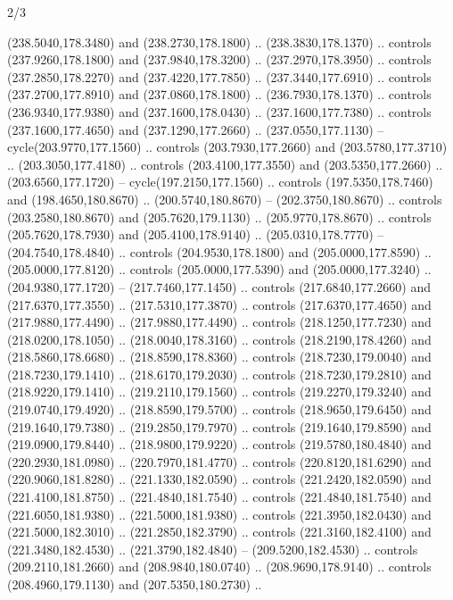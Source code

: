 \begin{flagdescription}{2/3}
\begin{scope}[xshift=0.5\flaglength,yshift=0.5\flagwidth,scale=\flagwidth/259.2]
\begin{scope}[y=0.8pt, x=0.8pt, yscale=-1,shift={(-243,-162)}]
      (238.5040,178.3480) and (238.2730,178.1800) .. (238.3830,178.1370) .. controls
      (237.9260,178.1800) and (237.9840,178.3200) .. (237.2970,178.3950) .. controls
      (237.2850,178.2270) and (237.4220,177.7850) .. (237.3440,177.6910) .. controls
      (237.2700,177.8910) and (237.0860,178.1800) .. (236.7930,178.1370) .. controls
      (236.9340,177.9380) and (237.1600,178.0430) .. (237.1600,177.7380) .. controls
      (237.1600,177.4650) and (237.1290,177.2660) .. (237.0550,177.1130) --
      cycle(203.9770,177.1560) .. controls (203.7930,177.2660) and
      (203.5780,177.3710) .. (203.3050,177.4180) .. controls (203.4100,177.3550) and
      (203.5350,177.2660) .. (203.6560,177.1720) -- cycle(197.2150,177.1560) ..
      controls (197.5350,178.7460) and (198.4650,180.8670) .. (200.5740,180.8670) --
      (202.3750,180.8670) .. controls (203.2580,180.8670) and (205.7620,179.1130) ..
      (205.9770,178.8670) .. controls (205.7620,178.7930) and (205.4100,178.9140) ..
      (205.0310,178.7770) -- (204.7540,178.4840) .. controls (204.9530,178.1800) and
      (205.0000,177.8590) .. (205.0000,177.8120) .. controls (205.0000,177.5390) and
      (205.0000,177.3240) .. (204.9380,177.1720) -- (217.7460,177.1450) .. controls
      (217.6840,177.2660) and (217.6370,177.3550) .. (217.5310,177.3870) .. controls
      (217.6370,177.4650) and (217.9880,177.4490) .. (217.9880,177.4490) .. controls
      (218.1250,177.7230) and (218.0200,178.1050) .. (218.0040,178.3160) .. controls
      (218.2190,178.4260) and (218.5860,178.6680) .. (218.8590,178.8360) .. controls
      (218.7230,179.0040) and (218.7230,179.1410) .. (218.6170,179.2030) .. controls
      (218.7230,179.2810) and (218.9220,179.1410) .. (219.2110,179.1560) .. controls
      (219.2270,179.3240) and (219.0740,179.4920) .. (218.8590,179.5700) .. controls
      (218.9650,179.6450) and (219.1640,179.7380) .. (219.2850,179.7970) .. controls
      (219.1640,179.8590) and (219.0900,179.8440) .. (218.9800,179.9220) .. controls
      (219.5780,180.4840) and (220.2930,181.0980) .. (220.7970,181.4770) .. controls
      (220.8120,181.6290) and (220.9060,181.8280) .. (221.1330,182.0590) .. controls
      (221.2420,182.0590) and (221.4100,181.8750) .. (221.4840,181.7540) .. controls
      (221.4840,181.7540) and (221.6050,181.9380) .. (221.5000,181.9380) .. controls
      (221.3950,182.0430) and (221.5000,182.3010) .. (221.2850,182.3790) .. controls
      (221.3160,182.4100) and (221.3480,182.4530) .. (221.3790,182.4840) --
      (209.5200,182.4530) .. controls (209.2110,181.2660) and (208.9840,180.0740) ..
      (208.9690,178.9140) .. controls (208.4960,179.1130) and (207.5350,180.2730) ..

\end{scope}
\end{scope}
\end{flagdescription}
